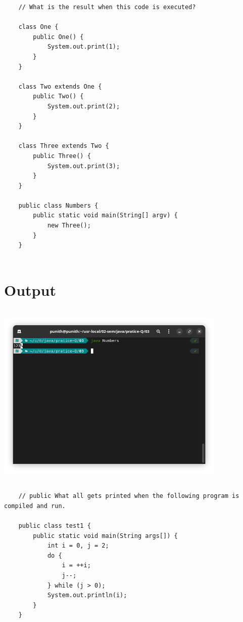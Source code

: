 \documentclass{article}
\begin{document}
 \begin{lstlisting}
    // What is the result when this code is executed?

    class One {
        public One() {
            System.out.print(1);
        }
    }
    
    class Two extends One {
        public Two() {
            System.out.print(2);
        }
    }
    
    class Three extends Two {
        public Three() {
            System.out.print(3);
        }
    }
    
    public class Numbers {
        public static void main(String[] argv) {
            new Three();
        }
    }
       
 \end{lstlisting}

 \section*{Output}
 \includegraphics[width=11cm, height=9cm]{./images/04.png}


 \begin{lstlisting}
    // public What all gets printed when the following program is compiled and run. 

    public class test1 {
        public static void main(String args[]) {
            int i = 0, j = 2;
            do {
                i = ++i;
                j--;
            } while (j > 0);
            System.out.println(i);
        }
    }
 \end{lstlisting}
\end{document}

